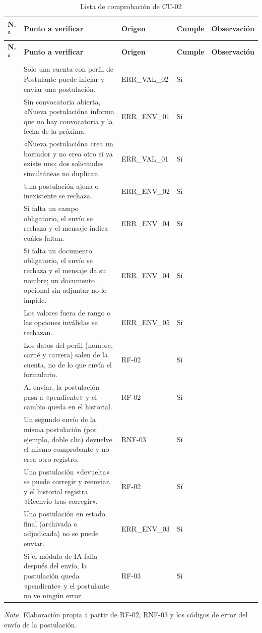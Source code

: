 \begingroup\footnotesize
\begin{longtable}{@{}>{\raggedright\arraybackslash}p{0.7cm}>{\raggedright\arraybackslash}p{7.6cm}>{\raggedright\arraybackslash}p{2.0cm}>{\raggedright\arraybackslash}p{1.2cm}>{\raggedright\arraybackslash}p{2.3cm}@{}}
\caption{Lista de comprobación de CU-02}\label{tab:lc_cu02}\\
\toprule
\textbf{N.°} & \textbf{Punto a verificar} & \textbf{Origen} & \textbf{Cumple} & \textbf{Observación} \\
\midrule
\endfirsthead
\toprule
\textbf{N.°} & \textbf{Punto a verificar} & \textbf{Origen} & \textbf{Cumple} & \textbf{Observación} \\
\midrule
\endhead
\bottomrule
\endfoot
1 & Solo una cuenta con perfil de Postulante puede iniciar y enviar una postulación. & ERR\_VAL\_02 & Sí & \\
2 & Sin convocatoria abierta, «Nueva postulación» informa que no hay convocatoria y la fecha de la próxima. & ERR\_ENV\_01 & Sí & \\
3 & «Nueva postulación» crea un borrador y no crea otro si ya existe uno; dos solicitudes simultáneas no duplican. & ERR\_VAL\_01 & Sí & \\
4 & Una postulación ajena o inexistente se rechaza. & ERR\_ENV\_02 & Sí & \\
5 & Si falta un campo obligatorio, el envío se rechaza y el mensaje indica cuáles faltan. & ERR\_ENV\_04 & Sí & \\
6 & Si falta un documento obligatorio, el envío se rechaza y el mensaje da su nombre; un documento opcional sin adjuntar no lo impide. & ERR\_ENV\_04 & Sí & \\
7 & Los valores fuera de rango o las opciones inválidas se rechazan. & ERR\_ENV\_05 & Sí & \\
8 & Los datos del perfil (nombre, carné y carrera) salen de la cuenta, no de lo que envía el formulario. & RF-02 & Sí & \\
9 & Al enviar, la postulación pasa a «pendiente» y el cambio queda en el historial. & RF-02 & Sí & \\
10 & Un segundo envío de la misma postulación (por ejemplo, doble clic) devuelve el mismo comprobante y no crea otro registro. & RNF-03 & Sí & \\
11 & Una postulación «devuelta» se puede corregir y reenviar, y el historial registra «Reenvío tras corregir». & RF-02 & Sí & \\
12 & Una postulación en estado final (archivada o adjudicada) no se puede enviar. & ERR\_ENV\_03 & Sí & \\
13 & Si el módulo de IA falla después del envío, la postulación queda «pendiente» y el postulante no ve ningún error. & RF-03 & Sí & \\
\end{longtable}
\endgroup
\noindent\textit{Nota.} Elaboración propia a partir de RF-02, RNF-03 y los códigos de error del envío de la postulación.

